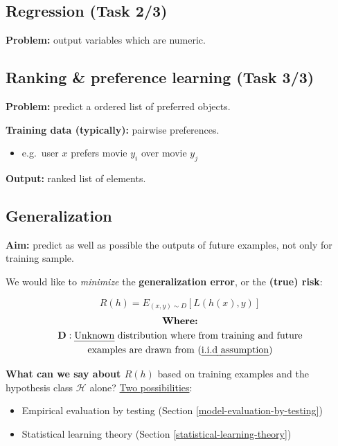 \documentclass[12pt, a4paper]{article}
\begin{document}
\subsection{Regression (Task 2/3) }\label{regression}

\textbf{Problem:} output variables which are numeric.





\subsection{Ranking \& preference learning (Task 3/3)
}\label{ranking-preference-learning}

\textbf{Problem:} predict a ordered list of preferred objects.

\textbf{Training data (typically):} pairwise preferences.

\begin{itemize}
  \item e.g.~user $x$ prefers movie $y_i$ over movie $y_j$
\end{itemize}

\textbf{Output:} ranked list of elements.




\subsection{Generalization}\label{generalization}

\textbf{Aim:} predict as well as possible the outputs of future
examples, not only for training sample.

We would like to \emph{minimize} the \textbf{generalization error}, or
the \textbf{(true) risk}:

\begin{equation} \label{eq:1}
  R(h) = E_{(x,y) \sim D}[L(h(x), y)]
\end{equation}
\begin{gather*}
  \textbf{Where:} \\
  \textbf{D}: \text{\uline{Unknown} distribution where from training and future} \\ \text{examples are drawn from (\uline{i.i.d assumption})}
\end{gather*}

\textbf{What can we say about $R(h)$} based on training examples and the
hypothesis class $\mathcal{H}$ alone? \uline{Two possibilities}:

\begin{itemize}
  \item Empirical evaluation by testing (Section \ref{model-evaluation-by-testing})
  \item Statistical learning theory (Section \ref{statistical-learning-theory})
\end{itemize}
\end{document}
